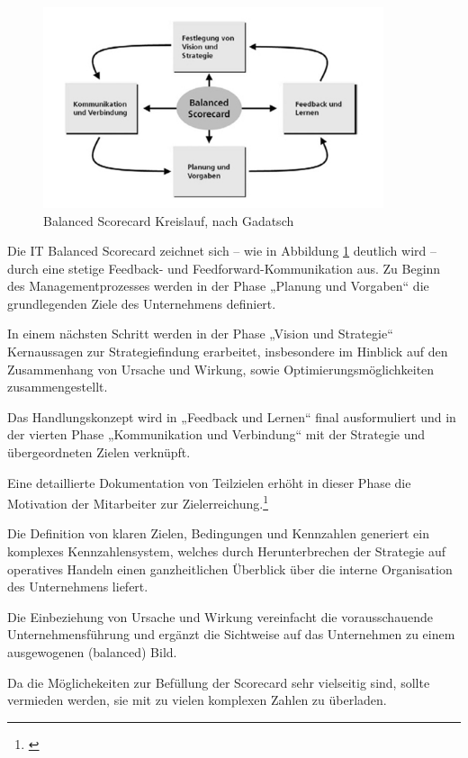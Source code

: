 \begin{figure}[h!]
	\centering
	\includegraphics[width=10cm]{kapitel/gruppe1_1/bilder/balanced_scorecard}
	\caption{Balanced Scorecard Kreislauf, nach Gadatsch}
	\label{fig_balanced_scorecard_cycle}
\end{figure}

Die IT Balanced Scorecard zeichnet sich – wie in Abbildung \ref{fig_balanced_scorecard_cycle} deutlich wird – durch eine stetige Feedback- und Feedforward-Kommunikation aus. 
Zu Beginn des Managementprozesses werden in der Phase „Planung und Vorgaben“ die grundlegenden Ziele des Unternehmens definiert.

In einem nächsten Schritt werden in der Phase „Vision und Strategie“ Kernaussagen zur Strategiefindung erarbeitet, insbesondere im Hinblick auf den Zusammenhang von Ursache und Wirkung, sowie Optimierungsmöglichkeiten zusammengestellt. 

Das Handlungskonzept wird in „Feedback und Lernen“ final ausformuliert und in der vierten Phase „Kommunikation und Verbindung“ mit der Strategie und übergeordneten Zielen verknüpft.

Eine detaillierte Dokumentation von Teilzielen erhöht in dieser Phase die Motivation der Mitarbeiter zur Zielerreichung.\footnote{\cite{kaufmann_feinschliff_2002}}

Die Definition von klaren Zielen, Bedingungen und Kennzahlen generiert ein komplexes Kennzahlensystem, welches durch Herunterbrechen der Strategie auf operatives Handeln einen ganzheitlichen Überblick über die interne Organisation des Unternehmens liefert.

Die Einbeziehung von Ursache und Wirkung vereinfacht die vorausschauende Unternehmensführung und ergänzt die Sichtweise auf das Unternehmen zu einem ausgewogenen (balanced) Bild.

Da die Möglichekeiten zur Befüllung der Scorecard sehr vielseitig sind, sollte vermieden werden, sie mit zu vielen komplexen Zahlen zu überladen. 

